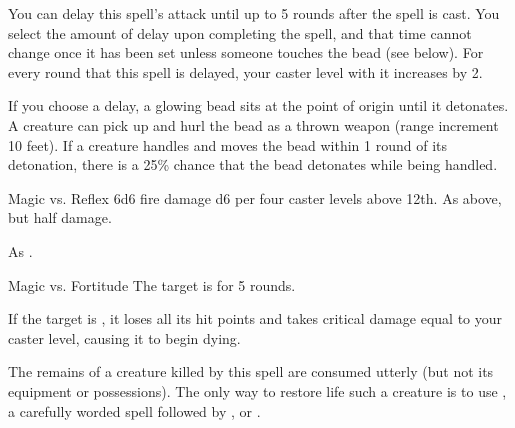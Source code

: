 \begin{spellheader}
\end{spellheader}
\begin{spelleffects}
    \spelleffect You can delay this spell's attack until up to 5 rounds after the spell is cast. You select the amount of delay upon completing the spell, and that time cannot change once it has been set unless someone touches the bead (see below). For every round that this spell is delayed, your caster level with it increases by 2.

    If you choose a delay, a glowing bead sits at the point of origin until it detonates. A creature can pick up and hurl the bead as a thrown weapon (range increment 10 feet). If a creature handles and moves the bead within 1 round of its detonation, there is a 25\% chance that the bead detonates while being handled.
    \begin{spellattack}{Magic vs. Reflex}
        \spellsuccess 6d6 fire damage \add d6 per four caster levels above 12th.
        \spellfailure As above, but half damage.
    \end{spellattack}
\end{spelleffects}
\begin{spellfooter}
    \spellnotes As .
\end{spellfooter}

\begin{spellheader}
    \spellrng{\rngclose}
\end{spellheader}
\begin{spelleffects}
    \begin{spellattack}{Magic vs. Fortitude}
        \spellsuccess The target is \staggered for 5 rounds.

        If the target is \bloodied, it loses all its hit points and takes critical damage equal to your caster level, causing it to begin dying.
    \end{spellattack}
\end{spelleffects}
\begin{spellfooter}
    \spellnotes The remains of a creature killed by this spell are consumed utterly (but not its equipment or possessions). The only way to restore life such a creature is to use , a carefully worded  spell followed by , or .
\end{spellfooter}

